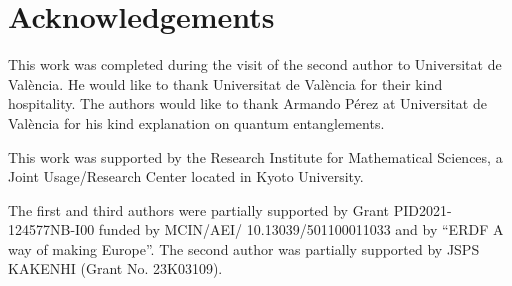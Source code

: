 \documentclass{amsart}
\theoremstyle{definition}
\theoremstyle{definition}
\theoremstyle{definition}
\begin{document}
{%
\vspace{5cm}
\section*{Acknowledgements}
This work was completed during the visit 
of the second author to Universitat de Val\`{e}ncia.
He would like to thank Universitat de Val\`{e}ncia for their kind hospitality.    
{\color{black}The authors would like to thank Armando Pérez 
at Universitat de Val\`{e}ncia for his kind explanation on  
quantum entanglements. }     
\par 
This work was supported 
by the Research Institute for Mathematical Sciences, 
a Joint Usage/Research Center located in Kyoto University. 
\par 
The first and third authors were partially supported by Grant
PID2021-124577NB-I00 funded by MCIN/AEI/ 10.13039/501100011033 
and by “ERDF A way of making 
Europe”.
The second author was partially 
supported by JSPS KAKENHI (Grant No. 23K03109).     


}
\end{document}
